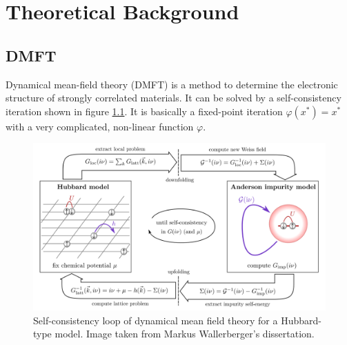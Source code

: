 \chapter{Theoretical Background}
\label{ch:background}

\section{DMFT}

Dynamical mean-field theory (DMFT) is a method to determine the electronic structure of strongly correlated materials. It can be solved by a self-consistency iteration shown in figure \ref{fig:dmft}.
It is basically a fixed-point iteration \(\varphi(x^\ast) = x^\ast\) with a very complicated, non-linear function \(\varphi\).

\begin{figure}[H]
    \centering
    \includegraphics[width=1.0\textwidth]{figures/dmft.png}
    \caption{Self-consistency loop of dynamical mean field theory for a Hubbard-type model. Image taken from Markus Wallerberger's dissertation.}
    \label{fig:dmft}
\end{figure}


